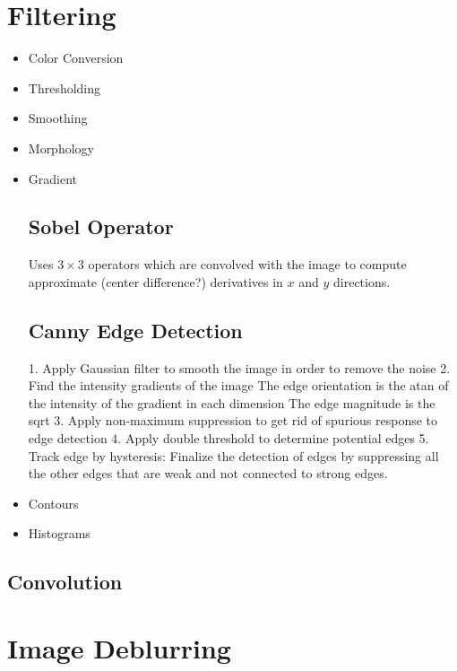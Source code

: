 \section{ Filtering}
\begin{itemize}
\item Color Conversion

\item Thresholding
\item Smoothing

\item Morphology
\item Gradient

\subsection{Sobel Operator}

Uses $3\times3$ operators which are convolved with the image to compute approximate (center difference?) derivatives in $x$ and $y$ directions.



\subsection{Canny Edge Detection}
1. Apply Gaussian filter to smooth the image in order to remove the noise
2. Find the intensity gradients of the image
	The edge orientation is the atan of the intensity of the gradient in each dimension
	The edge magnitude is the sqrt
3. Apply non-maximum suppression to get rid of spurious response to edge detection
4. Apply double threshold to determine potential edges
5. Track edge by hysteresis: Finalize the detection of edges by suppressing all the other edges that are weak and not connected to strong edges.

\item Contours
\item Histograms
\end{itemize}

\subsection{Convolution}



\section{Image Deblurring}



